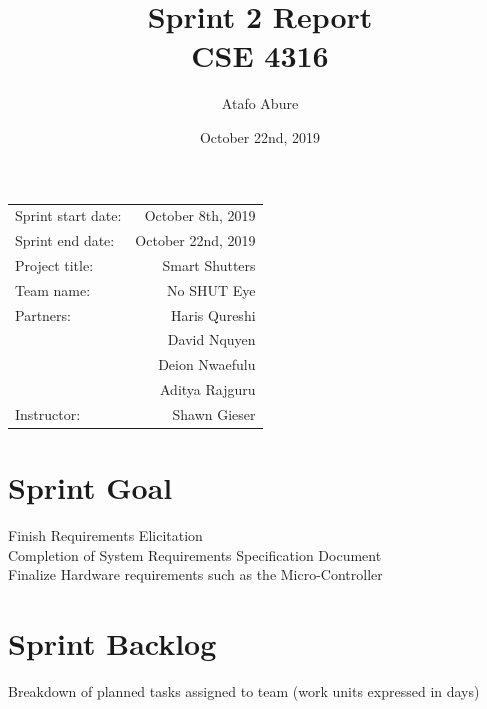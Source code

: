 \documentclass{article}
\title{Sprint 2 Report \\ CSE 4316}
\author{Atafo Abure}
\date{October 22nd, 2019}
\begin{document}
\maketitle
\begin{center}
\begin{tabular}{l r}

Sprint start date: & October 8th, 2019 \\

Sprint end date: & October 22nd, 2019 \\

Project title: & Smart Shutters \\

Team name: & No SHUT Eye \\

Partners: 	& Haris Qureshi\\
			& David Nquyen\\
			& Deion Nwaefulu \\
        	& Aditya Rajguru \\
Instructor: & Shawn Gieser
\end{tabular}
\end{center}

\section{Sprint Goal}
Finish Requirements Elicitation \\
Completion of System Requirements Specification Document \\
Finalize Hardware requirements such as the Micro-Controller \\

\section{Sprint Backlog}
Breakdown of planned tasks assigned to team (work units expressed in days) \\ %
\end{document}
